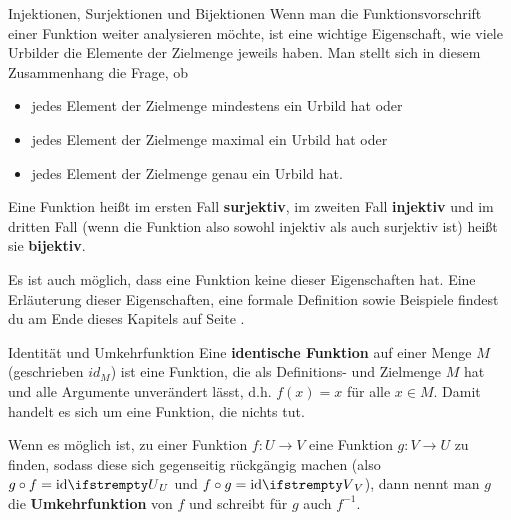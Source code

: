 \documentclass[../../main.tex]{subfiles}
\begin{document}
\begin{advanced}{Injektionen, Surjektionen und Bijektionen}
    Wenn man die Funktionsvorschrift einer Funktion weiter analysieren möchte, ist eine wichtige Eigenschaft, wie viele Urbilder die Elemente der Zielmenge jeweils haben. Man stellt sich in diesem Zusammenhang die Frage, ob
    \begin{itemize}[noitemsep]
        \item jedes Element der Zielmenge mindestens ein Urbild hat oder
        \item jedes Element der Zielmenge maximal ein Urbild hat oder
        \item jedes Element der Zielmenge genau ein Urbild hat.
    \end{itemize}
    
    Eine Funktion heißt im ersten Fall \textbf{surjektiv}, im zweiten Fall \textbf{injektiv} und im dritten Fall (wenn die Funktion also sowohl injektiv als auch surjektiv ist) heißt sie \textbf{bijektiv}.
    
    Es ist auch möglich, dass eine Funktion keine dieser Eigenschaften hat.
    Eine Erläuterung dieser Eigenschaften, eine formale Definition sowie Beispiele findest du am Ende dieses Kapitels auf Seite \pageref{advanced:bijektion}.
\end{advanced}

\begin{nutshell}{Identität und Umkehrfunktion}
    \sloppy
    Eine \textbf{identische Funktion} auf einer Menge $M$ (geschrieben $id_M$) ist eine Funktion, die als Definitions- und Zielmenge $M$ hat und alle Argumente unverändert lässt, d.h. $f(x)=x$ für alle $x\in M$. Damit handelt es sich um eine Funktion, die nichts tut.
    
    Wenn es möglich ist, zu einer Funktion $f\colon U\rightarrow V$ eine Funktion $g\colon V\rightarrow U$ zu finden, sodass diese sich gegenseitig rückgängig machen (also $g\circ f=\ident[U]$ und $f\circ g=\ident[V]$), dann nennt man $g$ die \textbf{Umkehrfunktion} von $f$ und schreibt für $g$ auch $f^{-1}$.
\end{nutshell}
\fussy
\end{document}
